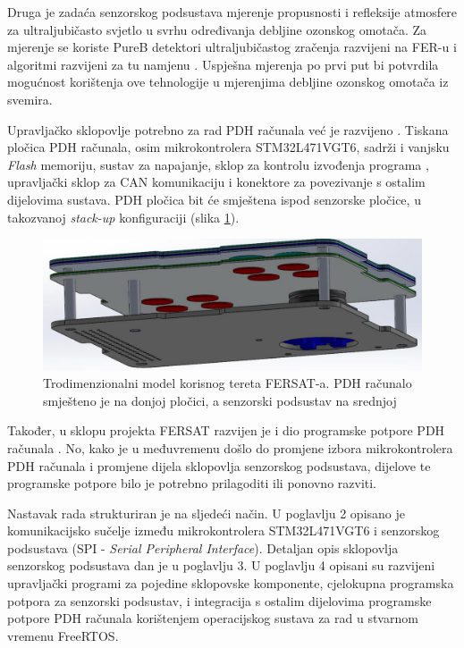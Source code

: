     Druga je zadaća senzorskog podsustava mjerenje propusnosti i refleksije atmosfere za ultraljubičasto svjetlo u svrhu određivanja debljine ozonskog omotača. Za mjerenje se koriste PureB detektori ultraljubičastog zračenja razvijeni na FER-u \cite{diplomski_filip_bogdanovic} i algoritmi razvijeni za tu namjenu \cite{zavrsni_kristian_stepancic}. Uspješna mjerenja po prvi put bi potvrdila mogućnost korištenja ove tehnologije u mjerenjima debljine ozonskog omotača iz svemira.

    Upravljačko sklopovlje potrebno za rad PDH računala već je razvijeno \cite{zavrsni_filip_juric}. Tiskana pločica PDH računala, osim mikrokontrolera STM32L471VGT6, sadrži i vanjsku \textit{Flash} memoriju, sustav za napajanje, sklop za kontrolu izvođenja programa , upravljački sklop za CAN komunikaciju i konektore za povezivanje s ostalim dijelovima sustava. PDH pločica bit će smještena ispod senzorske pločice, u takozvanoj \textit{stack-up} konfiguraciji (slika \ref{fig:fersat_3d}).

    \begin{figure}[htb]
        \centering
        \includegraphics[width=\textwidth]{slike/fersat_3d.png}
        \caption{Trodimenzionalni model korisnog tereta FERSAT-a. PDH računalo smješteno je na donjoj pločici, a senzorski podsustav na srednjoj \cite{zavrsni_filip_juric}}
        \label{fig:fersat_3d}
    \end{figure}

    Također, u sklopu projekta FERSAT razvijen je i dio programske potpore PDH računala \cite{diplomski_goran_petrak}. No, kako je u međuvremenu došlo do promjene izbora mikrokontrolera PDH računala i promjene dijela sklopovlja senzorskog podsustava, dijelove te programske potpore bilo je potrebno prilagoditi ili ponovno razviti.
    
    Nastavak rada strukturiran je na sljedeći način. U poglavlju 2 opisano je komunikacijsko sučelje između mikrokontrolera STM32L471VGT6 i senzorskog podsustava (SPI - \textit{Serial Peripheral Interface}). Detaljan opis sklopovlja senzorskog podsustava dan je u poglavlju 3. U poglavlju 4 opisani su razvijeni upravljački programi za pojedine sklopovske komponente, cjelokupna programska potpora za senzorski podsustav, i integracija s ostalim dijelovima programske potpore PDH računala korištenjem operacijskog sustava za rad u stvarnom vremenu FreeRTOS.
